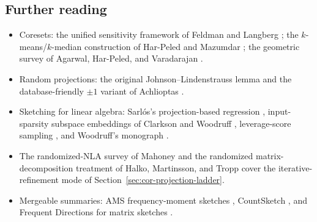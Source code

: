 \subsection{Further reading}

\begin{itemize}
\item Coresets: the unified sensitivity framework of Feldman and
  Langberg \citep{coresets-rnla-bg10}; the $k$-means/$k$-median
  construction of Har-Peled and Mazumdar \citep{coresets-rnla-bg9};
  the geometric survey of Agarwal, Har-Peled, and Varadarajan
  \citep{coresets-rnla-bg11}.
\item Random projections: the original Johnson--Lindenstrauss lemma
  \citep{coresets-rnla-bg1} and the database-friendly $\pm1$ variant
  of Achlioptas \citep{coresets-rnla-bg2}.
\item Sketching for linear algebra: Sarl\'os's projection-based
  regression \citep{coresets-rnla-bg4}, input-sparsity subspace
  embeddings of Clarkson and Woodruff \citep{coresets-rnla-bg5},
  leverage-score sampling \citep{coresets-rnla-bg8}, and Woodruff's
  monograph \citep{coresets-rnla-bg6}.
\item The randomized-NLA survey of Mahoney
  \citep{coresets-rnla-bg7} and the randomized matrix-decomposition
  treatment of Halko, Martinsson, and Tropp
  \citep{coresets-rnla-bg14} cover the iterative-refinement mode of
  Section~\ref{sec:cor-projection-ladder}.
\item Mergeable summaries: AMS frequency-moment sketches
  \citep{coresets-rnla-bg13}, CountSketch
  \citep{coresets-rnla-bg3}, and Frequent Directions for matrix
  sketches \citep{coresets-rnla-bg12}.
\end{itemize}


